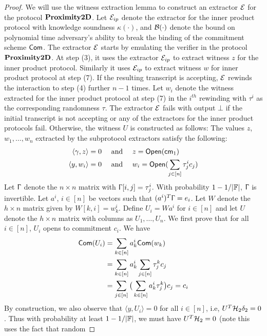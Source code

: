 \begin{proof}
We will use the witness extraction lemma to construct an extractor $\mathcal{E}$ for
the protocol $\mathbf{Proximity2D}$. Let $\mathcal{E}_{ip}$ denote the extractor for the
inner product protocol with knowledge soundness $\kappa(\cdot)$, and
$\mathcal{B}(\cdot)$ denote the bound on polynomial time adversary's ability to break
the binding of the commitment scheme $\mathsf{Com}$. The extractor $\mathcal{E}$ starts by
emulating the verifier in the protocol $\mathbf{Proximity2D}$. At step (3), it uses
the extractor $\mathcal{E}_{ip}$ to extract witness $z$ for the inner product
protocol. Similarly it uses $\mathcal{E}_{ip}$ to extract witness $w$ for inner
product protocol at step (7). If the resulting transcript is accepting, $\mathcal{E}$
rewinds the interaction to step (4) further $n-1$ times. Let $w_i$ denote the
witness extracted for the inner product protocol at step (7) in the $i^{th}$
rewinding with $\tau^i$ as the corresponding randomness $\tau$. The extractor $\mathcal{E}$ fails with output $\bot$ if the initial
transcript is not accepting or any of the extractors for the inner product
protocols fail. Otherwise, the witness $U$ is constructed as follows: The values
$z$, $w_1,\ldots,w_n$ extracted by the subprotocol extractors satisfy the
following:
\begin{align}
\langle \gamma,z\rangle=0 & \quad \text{ and } \quad z = \mathsf{Open}(\mathsf{cm}_1) \nonumber \\
\langle y,w_i\rangle=0 & \quad \text{ and } \quad w_i = \mathsf{Open}(\sum_{j\in [n]}\tau^i_jc_j) 
\end{align}
Let $\Upgamma$ denote the $n\times n$ matrix with $\Upgamma[i,j]=\tau^i_j$. With
probability $1-1/|\mathbb{F}|$, $\Upgamma$ is invertible. Let $a^i$, $i\in [n]$ be vectors
such that $(a^i)^T\Upgamma = e_i$. Let $W$ denote the $h\times n$ matrix given
by $W[k,i]=w^i_k$. Define $U_i=Wa^i$ for $i\in [n]$ and let $U$ denote the
$h\times n$ matrix with columns as $U_1,\ldots,U_n$. We first prove that for all
$i\in [n]$, $U_i$ opens to commitment $c_i$. We have 
\begin{align*}
\mathsf{Com}(U_i) &= \sum_{k\in [n]}a^i_k\mathsf{Com}(w_k) \\
&= \sum_{k\in [n]}a^i_k\sum_{j\in [n]}\tau^k_jc_j \\
&= \sum_{j\in [n]}\big(\sum_{k\in [n]}a^i_k\tau^k_j\big)c_j = c_i 
\end{align*} 
By construction, we also observe that $\langle y, U_i\rangle = 0$ for all $i\in
[n]$, i.e, $U^T\mathcal{H}_2\delta_2 = 0$. Thus with probability at least
$1-1/|\mathbb{F}|$, we must have $U^T\mathcal{H}_2=0$ (note this uses the fact that random

\end{proof}
